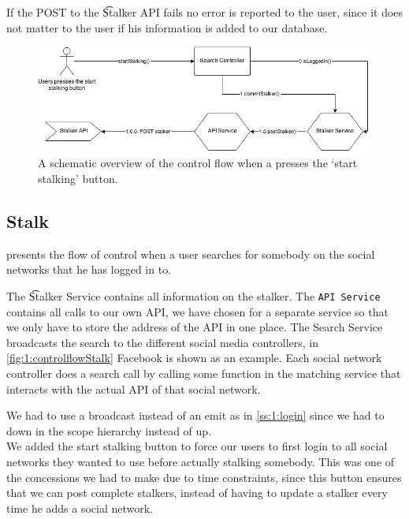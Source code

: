 	If the POST to the \t{Stalker API} fails no error is reported to the user, since it does not matter to the user if his information is added to our database. 

		\begin{figure}
			\includegraphics[width=\textwidth]{./img/1_start_stalking_flow}
			\caption{A schematic overview of the control flow when a presses the `start stalking' button.}
			\label{fig:1:controlflowStartStalk}
		\end{figure}


\subsection{Stalk}
	 presents the flow of control when a user searches for somebody on the social networks that he has logged in to.

	The \t{Stalker Service} contains all information on the stalker. The \texttt{API Service} contains all calls to our own API, we have chosen for a separate service so that we only have to store the address of the API in one place. The Search Service broadcasts the search to the different social media controllers, in \cref{fig:1:controlflowStalk} Facebook is shown as an example. Each social network controller does a search call by calling some function in the matching service that interacts with the actual API of that social network.


	We had to use a broadcast instead of an emit as in \cref{ss:1:login} since we had to down in the scope hierarchy instead of up. \\

	We added the start stalking button to force our users to first login to all social networks they wanted to use before actually stalking somebody. This was one of the concessions we had to make due to time constraints, since this button ensures that we can post complete stalkers, instead of having to update a stalker every time he adds a social network. 

